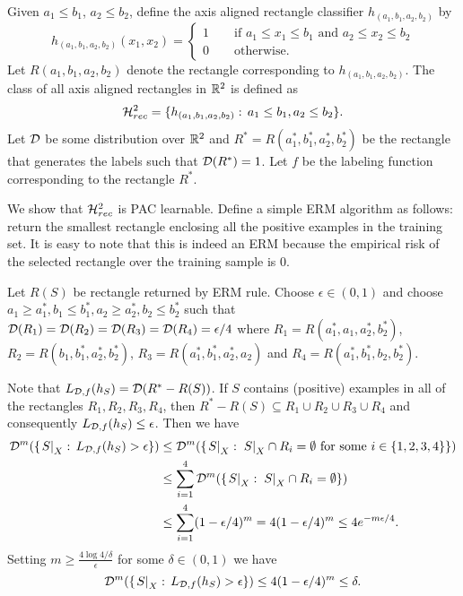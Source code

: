 \documentclass[11pt,a4paper]{article}
\begin{document}
\begin{example}
Given $a_1\le b_1$, $a_2\le b_2$, define the axis aligned rectangle classifier $h_{(a_1,b_1,a_2,b_2)}$ by
\begin{equation*}
h_{(a_1,b_1,a_2,b_2)}(x_1,x_2) = 
\begin{cases}
1\qquad \text{if } a_1\le x_1\le b_1 \text{ and } a_2\le x_2\le b_2 \\
0\qquad \text{otherwise.}
\end{cases}
\end{equation*}
Let $R(a_1,b_1,a_2,b_2)$ denote the rectangle corresponding to $h_{(a_1,b_1,a_2,b_2)}$. The class of all axis aligned rectangles in $\mathbb{R}^2$ is defined as
\begin{equation*}
\mathcal{H}^2_{rec} = \{h_{(a_1,b_1,a_2,b_2)}:\, a_1\le b_1,a_2\le b_2\}.
\end{equation*}
Let $\mathcal{D}$ be some distribution over $\mathbb{R}^2$ and $R^* = R({a_1^*,b_1^*,a_2^*,b_2^*})$ be the rectangle that generates the labels such that $\mathcal{D}(R^*) = 1$. Let $f$ be the labeling function corresponding to the rectangle $R^*$.

We show that $\mathcal{H}^2_{rec}$ is PAC learnable. Define a simple ERM algorithm as follows: return the smallest rectangle enclosing all the positive examples in the training set. It is easy to note that this is indeed an ERM because the empirical risk of the selected rectangle over the training sample is $0$.

Let $R(S)$ be rectangle returned by ERM rule. Choose $\epsilon\in(0,1)$ and choose $a_1\ge a_1^*,b_1\le b_1^*,a_2\ge a_2^*,b_2\le b_2^*$ such that $\mathcal{D}(R_1) = \mathcal{D}(R_2) = \mathcal{D}(R_3) = \mathcal{D}(R_4) = \epsilon/4$ where $R_1 = R(a_1^*,a_1,a_2^*,b_2^*)$, $R_2 = R({b_1,b_1^*,a_2^*,b_2^*})$, $R_3 = R({a_1^*,b_1^*,a_2^*,a_2})$ and $R_4 = R({a_1^*,b_1^*,b_2,b_2^*})$.

Note that $L_{\mathcal{D},f}(h_S) = \mathcal{D}(R^* - R(S))$. If $S$ contains (positive) examples in all of the rectangles $R_1,R_2,R_3,R_4$, then $R^*-R(S)\subseteq R_1\cup R_2\cup R_3\cup R_4$ and consequently $L_{\mathcal{D},f}(h_S) \le \epsilon$. Then we have
\begin{align*}
\mathcal{D}^m(\{\left.S\right|_{X}:\,L_{\mathcal{D},f}(h_S)> \epsilon\}) &\le 
\mathcal{D}^m(\{\left.S\right|_{X}:\, \left.S\right|_{X}\cap R_i = \emptyset \text{ for some }i\in \{1,2,3,4\} \})\\
&\le \sum_{i=1}^4 \mathcal{D}^m(\{\left.S\right|_{X}:\, \left.S\right|_{X}\cap R_i = \emptyset\})\\
&\le \sum_{i=1}^4 (1-\epsilon/4)^m = 4(1-\epsilon/4)^m \le 4e^{-m\epsilon/4}.
\end{align*}
Setting $m\ge \frac{4\log{ 4/\delta}}{\epsilon}$ for some $\delta\in(0,1)$ we have 
\begin{equation*}
\mathcal{D}^m(\{\left.S\right|_{X}:\,L_{\mathcal{D},f}(h_S)> \epsilon\}) \le  4(1-\epsilon/4)^m \le \delta.
\end{equation*}
\end{example}
\end{document}
